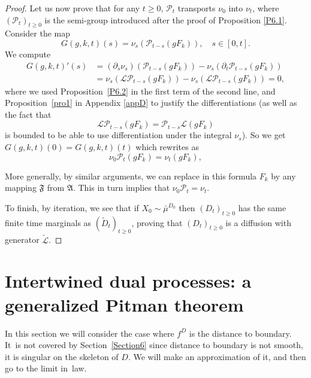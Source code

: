 \documentclass[JEP,XML,SOM,Unicode,NoFloatCountersInSection,published]{cedram}
\theoremstyle{plain}
\theoremstyle{definition}
\newcommand{\SL}{{\mathscr L}}
\newcommand{\SP}{{\mathscr P}}
\let\wi\widetilde
\newcommand{\fA}{\mathfrak{A}}
\newcommand{\fF}{\mathfrak{F}}
\begin{document}
\begin{proof}
Let us now prove that for any $t\geq 0$, $\SP_t$ transports $\nu_0$ into $\nu_t$, where $(\SP_t)_{t\geq 0}$ is the semi-group introduced after the proof of Proposition \ref{P6.1}. Consider the map
\begin{equation}
G(g,k,t)(s)=\nu_s\left(\SP_{t-s}(gF_k)\right), \quad s\in[0,t].
\end{equation}
We compute
\begin{equation}
\begin{split}
G(g,k,t)'(s)&=(\partial_s\nu_s)\left(\SP_{t-s}(gF_k)\right)-\nu_s\left(\partial_t\SP_{t-s}(gF_k)\right)\\
&=\nu_s\left(\SL \SP_{t-s}(gF_k)\right)-\nu_s\left(\SL \SP_{t-s}(gF_k)\right)=0,
\end{split}
\end{equation}
where we used Proposition~\ref{P6.2} in the first term of the second line, and Proposition~\ref{pro1} in Appendix \ref{appD} to justify the differentiations (as well as the fact that
\[
\SL \SP_{t-s}(gF_k)=\SP_{t-s}\SL (gF_k)
\]
is bounded to be able to use differentiation under the integral $\nu_s$).
So we get $ G(g,k,t)(0)=G(g,k,t)(t)$ which rewrites as
\begin{equation}
\nu_0\SP_t(gF_k)=\nu_t(gF_k),
\end{equation}\par
More generally, by similar arguments, we can replace in this formula $F_k$ by any mapping $\fF$ from $\fA$.
This in turn implies that $\nu_0\SP_t=\nu_t$.
\par
To finish, by iteration, we see that if $X_0\sim \bar\mu^{D_0}$ then $(D_t)_{t\ge0}$ has the same finite time marginals as $(\wi D_t)_{t\ge0}$, proving that $(D_t)_{t\ge0}$ is a diffusion with generator $\wi \SL$.
\end{proof}

\section{Intertwined dual processes: a generalized Pitman theorem}
\label{Section4}

In this section we will consider the case where $f^D$ is the distance to boundary. It~is not covered by Section~\ref{Section6} since distance to boundary is not smooth, it is singular on the skeleton of $D$. We will make an approximation of it, and then go to the limit in~law.
\end{document}
